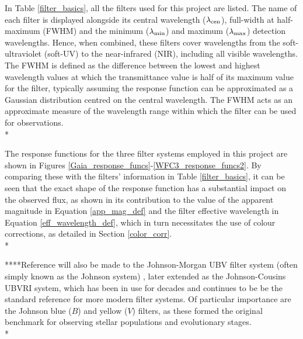 \documentclass[12pt, a4paper]{report}
\begin{document}
In Table \ref{filter_basics}, all the filters used for this project are listed. The name of each filter is displayed alongside its central wavelength ($\lambda_{\textnormal{cen}}$), full-width at half-maximum (FWHM) and the minimum ($\lambda_{\textnormal{min}}$) and maximum ($\lambda_{\textnormal{max}}$) detection wavelengths. Hence, when combined, these filters cover wavelengths from the soft-ultraviolet (soft-UV) to the near-infrared (NIR), including all visible wavelengths. The FWHM is defined as the difference between the lowest and highest wavelength values at which the transmittance value is half of its maximum value for the filter, typically assuming the response function can be approximated as a Gaussian distribution centred on the central wavelength. The FWHM acts as an approximate measure of the wavelength range within which the filter can be used for observations.\\*

The response functions for the three filter systems employed in this project are shown in Figures \ref{Gaia_response_funcs}-\ref{WFC3_response_funcs2}. By comparing these with the filters' information in Table \ref{filter_basics}, it can be seen that the exact shape of the response function has a substantial impact on the observed flux, as shown in its contribution to the value of the apparent magnitude in Equation \ref{app_mag_def} and the filter effective wavelength in Equation \ref{eff_wavelength_def}, which in turn necessitates the use of colour corrections, as detailed in Section \ref{color_corr}.\\*

****Reference will also be made to the Johnson-Morgan UBV filter system (often simply known as the Johnson system) \citep{1953ApJ...117..313J}, later extended as the Johnson-Cousins UBVRI \citep{1990PASP..102.1181B} system, which has been in use for decades and continues to be be the standard reference for more modern filter systems. Of particular importance are the Johnson blue ($B$) and yellow ($V$) filters, as these formed the original benchmark for observing stellar populations and evolutionary stages. \\*
\end{document}
